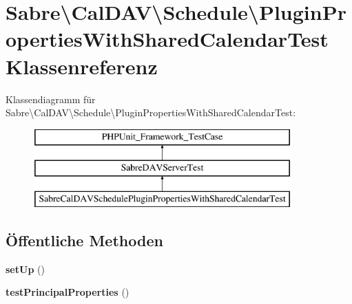 \hypertarget{class_sabre_1_1_cal_d_a_v_1_1_schedule_1_1_plugin_properties_with_shared_calendar_test}{}\section{Sabre\textbackslash{}Cal\+D\+AV\textbackslash{}Schedule\textbackslash{}Plugin\+Properties\+With\+Shared\+Calendar\+Test Klassenreferenz}
\label{class_sabre_1_1_cal_d_a_v_1_1_schedule_1_1_plugin_properties_with_shared_calendar_test}
Klassendiagramm für Sabre\textbackslash{}Cal\+D\+AV\textbackslash{}Schedule\textbackslash{}Plugin\+Properties\+With\+Shared\+Calendar\+Test\+:\begin{figure}[H]
\begin{center}
\leavevmode
\includegraphics[height=3.000000cm]{class_sabre_1_1_cal_d_a_v_1_1_schedule_1_1_plugin_properties_with_shared_calendar_test}
\end{center}
\end{figure}
\subsection*{Öffentliche Methoden}
\begin{DoxyCompactItemize}
\item 
\mbox{\label{class_sabre_1_1_cal_d_a_v_1_1_schedule_1_1_plugin_properties_with_shared_calendar_test_af345e49903f2aa8fa6dad9cdd88d9964}} 
{\bfseries set\+Up} ()
\item 
\mbox{\label{class_sabre_1_1_cal_d_a_v_1_1_schedule_1_1_plugin_properties_with_shared_calendar_test_a808487948aed2f2bffba3167ee15deb2}} 
{\bfseries test\+Principal\+Properties} ()
\end{DoxyCompactItemize}
